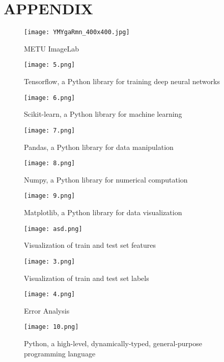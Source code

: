 \documentclass{article}
\begin{document}
\section{APPENDIX}
\begin{figure}[h]
    \centering
    \texttt{[image: YMYgaRmn\_400x400.jpg]}
    \caption{METU ImageLab}
    \label{1}
\end{figure}
\begin{figure}
    \centering
    \texttt{[image: 5.png]}
    \caption{Tensorflow, a Python library for training deep neural networks}
    \label{5}
\end{figure}
\begin{figure}
    \centering
    \texttt{[image: 6.png]}
    \caption{Scikit-learn, a Python library for machine learning}
    \label{6}
\end{figure}
\begin{figure}
    \centering
    \texttt{[image: 7.png]}
    \caption{Pandas, a Python library for data manipulation}
    \label{7}
\end{figure}
\begin{figure}
    \centering
    \texttt{[image: 8.png]}
    \caption{Numpy, a Python library for numerical computation}
    \label{8}
\end{figure}
\begin{figure}
    \centering
    \texttt{[image: 9.png]}
    \caption{Matplotlib, a Python library for data visualization}
    \label{9}
\end{figure}
\begin{figure}
    \centering
    \texttt{[image: asd.png]}
    \caption{Visualization of train and test set features}
    \label{2}
\end{figure}
\begin{figure}
    \centering
    \texttt{[image: 3.png]}
    \caption{Visualization of train and test set labels}
    \label{3}
\end{figure}
\begin{figure}
    \centering
    \texttt{[image: 4.png]}
    \caption{Error Analysis}
    \label{4}
\end{figure}
\begin{figure}
    \centering
    \texttt{[image: 10.png]}
    \caption{Python, a high-level, dynamically-typed, general-purpose programming language}
    \label{10}
\end{figure}
\end{document}
